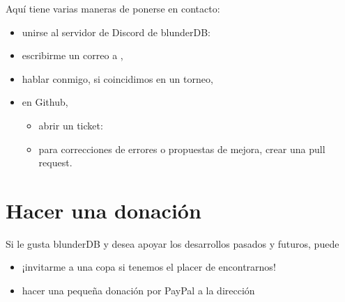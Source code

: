\documentclass[letterpaper,10pt,spanish]{sphinxmanual}
\begin{document}
\sphinxAtStartPar
Aquí tiene varias maneras de ponerse en contacto:
\begin{itemize}
\item {} 
\sphinxAtStartPar
unirse al servidor de Discord de blunderDB: 

\item {} 
\sphinxAtStartPar
escribirme un correo a ,

\item {} 
\sphinxAtStartPar
hablar conmigo, si coincidimos en un torneo,

\item {} 
\sphinxAtStartPar
en Github,
\begin{itemize}
\item {} 
\sphinxAtStartPar
abrir un ticket: 

\item {} 
\sphinxAtStartPar
para correcciones de errores o propuestas de mejora, crear una pull request.

\end{itemize}

\end{itemize}


\chapter{Hacer una donación}
\label{\detokenize{index:faire-un-don}}
\sphinxAtStartPar
Si le gusta blunderDB y desea apoyar los desarrollos pasados y futuros, puede
\begin{itemize}
\item {} 
\sphinxAtStartPar
¡invitarme a una copa si tenemos el placer de encontrarnos!

\item {} 
\sphinxAtStartPar
hacer una pequeña donación por PayPal a la dirección 

\end{itemize}
\end{document}
